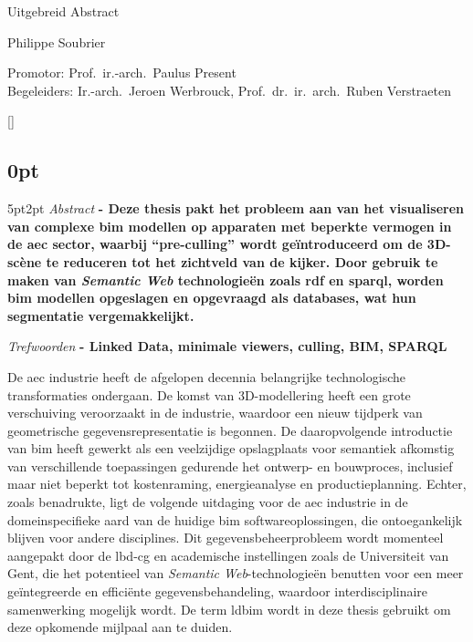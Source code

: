 \begin{center}
    \sffamily
    \huge Uitgebreid Abstract

    \Large Philippe Soubrier

    \normalsize
    Promotor: Prof.\ ir.-arch.\ Paulus Present\\
    Begeleiders: Ir.-arch.\ Jeroen Werbrouck, Prof.\ dr.\ ir.\ arch.\ Ruben Verstraeten
\end{center}
\begin{refsection}
    []{}
    \begin{multicols}{2}
        \small
        \titlespacing\subsection{0pt}{5pt}{2pt}
        \emph{Abstract} \textbf{
            - Deze thesis pakt het probleem aan van het visualiseren van complexe \ac{bim} modellen op apparaten met beperkte vermogen in de \ac{aec} sector, waarbij \enquote{pre-culling} wordt geïntroduceerd om de 3D-scène te reduceren tot het zichtveld van de kijker. Door gebruik te maken van \emph{Semantic Web} technologieën zoals \ac{rdf} en \ac{sparql}, worden \ac{bim} modellen opgeslagen en opgevraagd als databases, wat hun segmentatie vergemakkelijkt.
        }

        \emph{Trefwoorden} \textbf{
            - Linked Data, minimale viewers, culling, BIM, SPARQL
        }

        De \ac{aec} industrie heeft de afgelopen decennia belangrijke technologische transformaties ondergaan. De komst van 3D-modellering heeft een grote verschuiving veroorzaakt in de industrie, waardoor een nieuw tijdperk van geometrische gegevensrepresentatie is begonnen. De daaropvolgende introductie van \ac{bim} heeft gewerkt als een veelzijdige opslagplaats voor semantiek afkomstig van verschillende toepassingen gedurende het ontwerp- en bouwproces, inclusief maar niet beperkt tot kostenraming, energieanalyse en productieplanning. Echter, zoals \cite{Werbrouck2018} benadrukte, ligt de volgende uitdaging voor de \ac{aec} industrie in de domeinspecifieke aard van de huidige \ac{bim} softwareoplossingen, die ontoegankelijk blijven voor andere disciplines. Dit gegevensbeheerprobleem wordt momenteel aangepakt door de \ac{lbd-cg} en academische instellingen zoals de Universiteit van Gent, die het potentieel van \emph{Semantic Web}-technologieën benutten voor een meer geïntegreerde en efficiënte gegevensbehandeling, waardoor interdisciplinaire samenwerking mogelijk wordt. De term \ac{ldbim} wordt in deze thesis gebruikt om deze opkomende mijlpaal aan te duiden.


\end{multicols}
\end{refsection}
